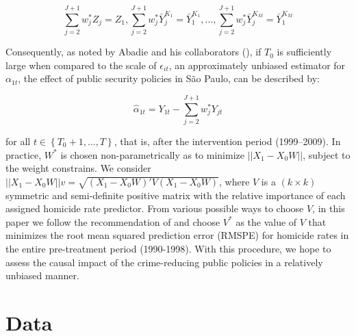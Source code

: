\documentclass[a4paper,11pt]{article}
\begin{document}
$$\sum_{j = 2}^{J + 1} w_{j}^{*} Z_{j} = Z_{1}, \sum_{j = 2}^{J + 1} w_{j}^{*}\bar{Y}_{j}^{K_{1}} = \bar{Y}_{1}^{K_{1}}, \dots, \sum_{j = 2}^{J + 1} w_{j}^{*}\bar{Y}_{j}^{K_{M}} = \bar{Y}_{1}^{K_{M}}$$ 

Consequently, as noted by Abadie and his collaborators (\citeyear{abadie2010}), if $T_{0}$ is sufficiently large when compared to the scale of $\epsilon_{it}$, an approximately unbiased estimator for $\alpha_{1t}$, the effect of public security policies in S\~{a}o Paulo, can be described by:

$$\hat{\alpha}_{1t} = Y_{1t} - \sum_{j = 2}^{J + 1} w_{j}^{*} Y_{jt}$$

for all $t \in \left\{T_{0} + 1, \dots, T \right\}$, that is, after the intervention period (1999--2009). In practice, $W^{*}$ is chosen non-parametrically as to minimize $||X_{1} - X_{0}W||$, subject to the weight constrains. We consider $||X_{1} - X_{0}W||v = \sqrt{(X_{1} - X_{0}W)'V (X_{1} - X_{0}W)}$, where $V$ is a $(k \times k)$ symmetric and semi-definite positive matrix with the relative importance of each assigned homicide rate predictor. From various possible ways to choose $V$, in this paper we follow the recommendation of \citet{abadie2003} and choose $V^{*}$ as the value of $V$ that minimizes the root mean squared prediction error (RMSPE) for homicide rates in the entire pre-treatment period (1990-1998). With this procedure, we hope to assess the causal impact of the crime-reducing public policies in a relatively unbiased manner. 

\section{Data}
\end{document}
